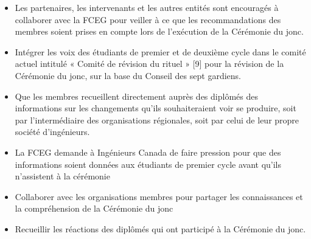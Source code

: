 \begin{itemize}
 \item Les partenaires, les intervenants et les autres entités sont encouragés à collaborer avec la FCEG pour veiller à ce que les recommandations des membres soient prises en compte lors de l'exécution de la Cérémonie du jonc.
 \item Intégrer les voix des étudiants de premier et de deuxième cycle dans le comité actuel intitulé « Comité de révision du rituel » [9] pour la révision de la Cérémonie du jonc, sur la base du Conseil des sept gardiens.
 \item Que les membres recueillent directement auprès des diplômés des informations sur les changements qu'ils souhaiteraient voir se produire, soit par l'intermédiaire des organisations régionales, soit par celui de leur propre société d'ingénieurs.
 \item La FCEG demande à Ingénieurs Canada de faire pression pour que des informations soient données aux étudiants de premier cycle avant qu'ils n'assistent à la cérémonie
\end{itemize}

\begin{itemize}
 \item Collaborer avec les organisations membres pour partager les connaissances et la compréhension de la Cérémonie du jonc
 \item Recueillir les réactions des diplômés qui ont participé à la Cérémonie du jonc.
\end{itemize}

